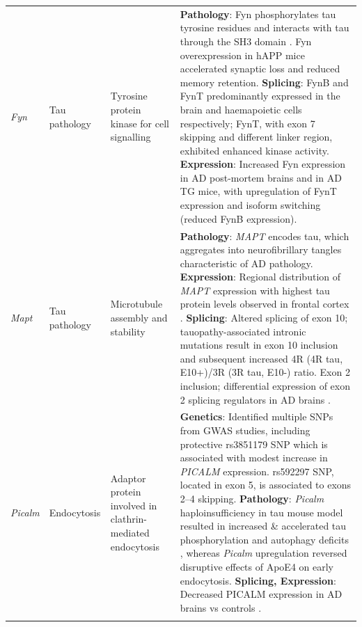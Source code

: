 \begin{landscape}
\begin{longtable}[c]{p{1cm}p{2cm}p{4cm}p{19cm}}
			\centering \textit{Fyn} &
			\centering Tau pathology  &
			\centering Tyrosine protein kinase for cell signalling &			
			\tabitem \textbf{Pathology}: Fyn phosphorylates tau tyrosine residues and interacts with tau through the SH3 domain \cite{Bhaskar2010}. \newline 
			\tabitem Fyn overexpression in hAPP mice accelerated synaptic loss and reduced memory retention\cite{Chin2005}. \newline
			\tabitem \textbf{Splicing}: FynB and FynT predominantly expressed in the brain and haemapoietic cells respectively; FynT, with exon 7 skipping and different linker region, exhibited enhanced kinase activity.\newline
			\tabitem \textbf{Expression}: Increased Fyn expression in AD post-mortem brains\cite{Lee2016b} and in AD TG mice\cite{Low2021}, with upregulation of FynT expression and isoform switching (reduced FynB expression)\cite{Lee2016b}. \\
			
			\centering \textit{Mapt} &
			\centering Tau pathology  &
			\centering Microtubule assembly and stability  &			
			\tabitem  \textbf{Pathology}: \textit{MAPT} encodes tau, which aggregates into neurofibrillary tangles characteristic of AD pathology. \newline 
			\tabitem \textbf{Expression}: Regional distribution of \textit{MAPT} expression with highest tau protein levels observed in frontal cortex \cite{Trabzuni2012}. \newline
			\tabitem \textbf{Splicing}: Altered splicing of exon 10; tauopathy-associated intronic mutations result in exon 10 inclusion and subsequent increased 4R (4R tau, E10+)/3R (3R tau, E10-) ratio\cite{Bowles2022}. \newline
			\tabitem Exon 2 inclusion; differential expression of exon 2 splicing regulators in AD brains \cite{Bowles2022}. \\
			\hdashline[0.5pt/5pt]
			
			\centering \textit{Picalm} &
			\centering Endocytosis  &
			\centering Adaptor protein involved in clathrin-mediated endocytosis &	
			\tabitem \textbf{Genetics}: Identified multiple SNPs from GWAS studies, including protective rs3851179 SNP which is associated with modest increase in \textit{PICALM} expression. \newline 
			\tabitem rs592297 SNP, located in exon 5, is associated to exons 2–4 skipping\cite{Parikh2014}. \newline
			\tabitem \textbf{Pathology}: \textit{Picalm} haploinsufficiency in tau mouse model resulted in increased \& accelerated tau phosphorylation and autophagy deficits \cite{Ando2020}, whereas \textit{Picalm} upregulation reversed disruptive effects of ApoE4 on early endocytosis.\cite{Narayan2020} \newline
			\tabitem \textbf{Splicing, Expression}: Decreased PICALM expression in AD brains vs controls \cite{Ando2016}. \\
			\hdashline[0.5pt/5pt]
			

\end{longtable}
\end{landscape}
